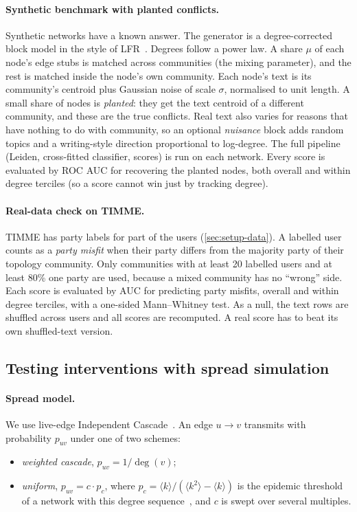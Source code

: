\paragraph{Synthetic benchmark with planted conflicts.}
Synthetic networks have a known answer. The generator is a degree-corrected block
model in the style of LFR~\citep{lancichinetti2008benchmark,karrer2011stochastic}.
Degrees follow a power law. A share $\mu$ of each node's edge stubs is matched across
communities (the mixing parameter), and the rest is matched inside the node's own
community. Each node's text is its community's centroid plus Gaussian noise of scale
$\sigma$, normalised to unit length. A small share of nodes is \emph{planted}: they
get the text centroid of a different community, and these are the true conflicts.
Real text also varies for reasons that have nothing to do with community, so an
optional \emph{nuisance} block adds random topics and a writing-style direction
proportional to log-degree. The full pipeline (Leiden, cross-fitted classifier,
scores) is run on each network. Every score is evaluated by ROC AUC for recovering
the planted nodes, both overall and within degree terciles (so a score cannot win
just by tracking degree).

\paragraph{Real-data check on TIMME.}
TIMME has party labels for part of the users (\cref{sec:setup-data}). A labelled user
counts as a \emph{party misfit} when their party differs from the majority party of
their topology community. Only communities with at least 20 labelled users and at
least 80\% one party are used, because a mixed community has no ``wrong'' side. Each
score is evaluated by AUC for predicting party misfits, overall and within degree
terciles, with a one-sided Mann--Whitney test. As a null, the text rows are shuffled
across users and all scores are recomputed. A real score has to beat its own
shuffled-text version.

\subsection{Testing interventions with spread simulation}
\label{sec:method-block}

\paragraph{Spread model.}
We use live-edge Independent Cascade~\citep{kempe2003maximizing}. An edge $u\to v$
transmits with probability $p_{uv}$ under one of two schemes:
\begin{itemize}
  \item \emph{weighted cascade}, $p_{uv}=1/\deg(v)$;
  \item \emph{uniform}, $p_{uv}=c\cdot p_c$, where
        $p_c = \langle k\rangle / (\langle k^2\rangle - \langle k\rangle)$ is the
        epidemic threshold of a network with this degree
        sequence~\citep{newman2002spread}, and $c$ is swept over several multiples.
\end{itemize}

